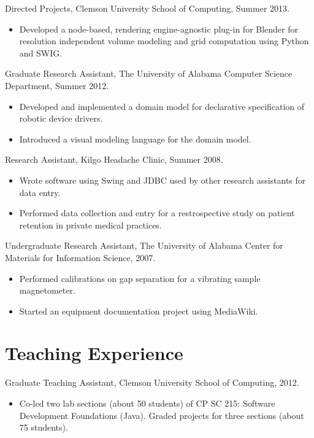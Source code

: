 \documentclass[12pt,oldfontcommands]{memoir}
\begin{document}
Directed Projects, Clemson University School of Computing, Summer 2013.

\begin{itemize}
  \item Developed a node-based, rendering engine-agnostic plug-in for Blender
        for resolution independent volume modeling and grid computation using Python
        and SWIG.
\end{itemize}

Graduate Research Assistant, The University of Alabama Computer Science
Department, Summer 2012.

\begin{itemize}
  \item Developed and implemented a domain model for declarative specification
        of robotic device drivers.
  \item Introduced a visual modeling language for the domain model.
\end{itemize}

Research Assistant, Kilgo Headache Clinic, Summer 2008.

\begin{itemize}
  \item Wrote software using Swing and JDBC used by other research assistants
        for data entry.
  \item Performed data collection and entry for a restrospective study on
        patient retention in private medical practices.
\end{itemize}

Undergraduate Research Assistant, The University of Alabama Center for
Materials for Information Science, 2007.

\begin{itemize}
  \item Performed calibrations on gap separation for a vibrating sample
        magnetometer.
  \item Started an equipment documentation project using MediaWiki.
\end{itemize}

\section*{Teaching Experience}

Graduate Teaching Assistant, Clemson University School of Computing, 2012.

\begin{itemize}
  \item Co-led two lab sections (about 50 students) of CP SC 215: Software
        Development Foundations (Java). Graded projects for three sections (about 75
        students).
\end{itemize}
\end{document}

